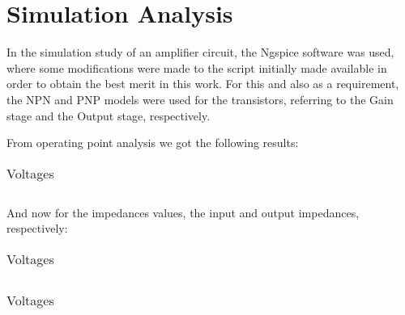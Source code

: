 \section{Simulation Analysis}
\label{sec:simulation} 

In the simulation study of an amplifier circuit, the Ngspice software was used, where some modifications were made to the script initially made available in order to obtain the best merit in this work. For this and also as a requirement, the NPN and PNP models were used for the transistors, referring to the Gain stage and the Output stage, respectively.

From operating point analysis we got the following results:
\FloatBarrier
\begin{table}[h]
  \centering
  \begin{tabular}{|c|c|c|c|c|}
    \hline    
    
    \hline
  \end{tabular}
  \caption{Voltages}
  \label{tab:Spice1}
\end{table}
\FloatBarrier  

And now for the impedances values, the input and output impedances, respectively:

\FloatBarrier
\begin{table}[h]
  \centering
  \begin{tabular}{|c|}
    \hline    
    
    \hline
  \end{tabular}
  \caption{Voltages}
  \label{tab:Spice1}
\end{table}
\FloatBarrier   

\FloatBarrier
\begin{table}[h]
  \centering
  \begin{tabular}{|c|}
    \hline    
    
    \hline
  \end{tabular}
  \caption{Voltages}
  \label{tab:Spice1}
\end{table}
\FloatBarrier  




